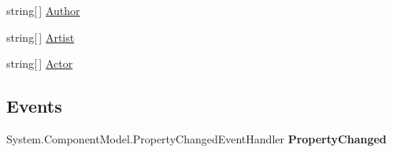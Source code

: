 \begin{DoxyCompactItemize}
\begin{DoxyCompactList}\small\item\em \end{DoxyCompactList}\item 
\hypertarget{class_amazon___price___finder_1_1amazon_1_1ecs_1_1_top_item_set_top_item_ad4fb47140060b9723e593236039eba73}{string\mbox{[}$\,$\mbox{]} \hyperlink{class_amazon___price___finder_1_1amazon_1_1ecs_1_1_top_item_set_top_item_ad4fb47140060b9723e593236039eba73}{Author}}\label{class_amazon___price___finder_1_1amazon_1_1ecs_1_1_top_item_set_top_item_ad4fb47140060b9723e593236039eba73}

\begin{DoxyCompactList}\small\item\em \end{DoxyCompactList}\item 
\hypertarget{class_amazon___price___finder_1_1amazon_1_1ecs_1_1_top_item_set_top_item_a10a59f706770e23d39e4c873289cd4de}{string\mbox{[}$\,$\mbox{]} \hyperlink{class_amazon___price___finder_1_1amazon_1_1ecs_1_1_top_item_set_top_item_a10a59f706770e23d39e4c873289cd4de}{Artist}}\label{class_amazon___price___finder_1_1amazon_1_1ecs_1_1_top_item_set_top_item_a10a59f706770e23d39e4c873289cd4de}

\begin{DoxyCompactList}\small\item\em \end{DoxyCompactList}\item 
\hypertarget{class_amazon___price___finder_1_1amazon_1_1ecs_1_1_top_item_set_top_item_aebfa8b9348a510982adc842eac449037}{string\mbox{[}$\,$\mbox{]} \hyperlink{class_amazon___price___finder_1_1amazon_1_1ecs_1_1_top_item_set_top_item_aebfa8b9348a510982adc842eac449037}{Actor}}\label{class_amazon___price___finder_1_1amazon_1_1ecs_1_1_top_item_set_top_item_aebfa8b9348a510982adc842eac449037}

\begin{DoxyCompactList}\small\item\em \end{DoxyCompactList}\end{DoxyCompactItemize}
\subsection*{Events}
\begin{DoxyCompactItemize}
\item 
\hypertarget{class_amazon___price___finder_1_1amazon_1_1ecs_1_1_top_item_set_top_item_a26b7b312da45d3db5b62607a7fcd4f13}{System.\-Component\-Model.\-Property\-Changed\-Event\-Handler {\bfseries Property\-Changed}}\label{class_amazon___price___finder_1_1amazon_1_1ecs_1_1_top_item_set_top_item_a26b7b312da45d3db5b62607a7fcd4f13}

\end{DoxyCompactItemize}


